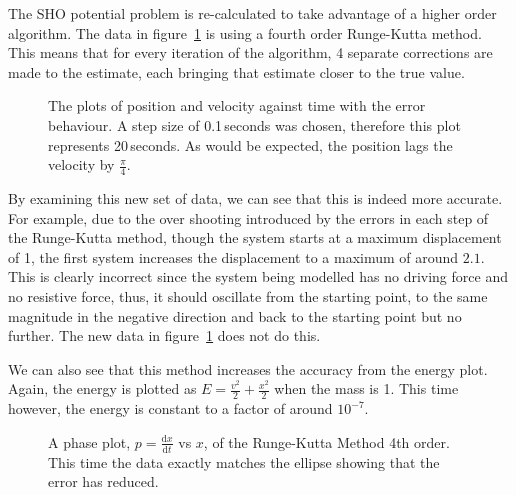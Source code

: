 \documentclass[11pt]{article} %
\newcommand{\inputTikZ}[1]{%
	}
\newcommand{\inputTikZ}[1]{%
		\beginpgfgraphicnamed{#1-external}%
		\endpgfgraphicnamed%
	}
\newcommand{\dx}[2]{\frac{\textrm{d} #1}{\textrm{d} #2}} %
\begin{document}
The SHO potential problem is re-calculated to take advantage of a higher order algorithm. The data in figure~\ref{fig:runge4} is using a fourth order Runge-Kutta method. This means that for every iteration of the algorithm, 4 separate corrections are made to the estimate, each bringing that estimate closer to the true value.
\begin{figure}[ht]
	\centering
		\inputTikZ{Graph3}
	\caption{\label{fig:runge4}The plots of position and velocity against time with the error behaviour. A step size of 0.1\,seconds was chosen, therefore this plot represents 20\,seconds. As would be expected, the position lags the velocity by $\frac{\pi}{4}$.}
\end{figure}

By examining this new set of data, we can see that this is indeed more accurate. For example, due to the over shooting introduced by the errors in each step of the Runge-Kutta method, though the system starts at a maximum displacement of 1, the first system increases the displacement to a maximum of around $2.1$. This is clearly incorrect since the system being modelled has no driving force and no resistive force, thus, it should oscillate from the starting point, to the same magnitude in the negative direction and back to the starting point but no further. The new data in figure~\ref{fig:runge4} does not do this. 

We can also see that this method increases the accuracy from the energy plot. Again, the energy is plotted as $E=\frac{v^2}{2} + \frac{x^2}{2}$ when the mass is 1. This time however, the energy is constant to a factor of around $10^{-7}$. 
\begin{figure}[ht]
	\centering
		\inputTikZ{Graph5}
	\caption{\label{fig:phase2}A phase plot, $p=\dx{x}{t}$ vs $x$, of the Runge-Kutta Method 4th order. This time the data exactly matches the ellipse showing that the error has reduced.}
\end{figure}
\end{document}
